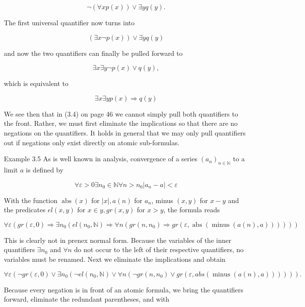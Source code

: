 \documentclass[10pt]{article}
\begin{document}
$$
\neg(\forall x p(x)) \vee \exists y q(y) .
$$

The first universal quantifier now turns into

$$
(\exists x \neg p(x)) \vee \exists y q(y)
$$

and now the two quantifiers can finally be pulled forward to

$$
\exists x \exists y \neg p(x) \vee q(y),
$$

which is equivalent to

$$
\exists x \exists y p(x) \Rightarrow q(y)
$$

We see then that in (3.4) on page 46 we cannot simply pull both quantifiers to the front. Rather, we must first eliminate the implications so that there are no negations on the quantifiers. It holds in general that we may only pull quantifiers out if negations only exist directly on atomic sub-formulas.

Example 3.5 As is well known in analysis, convergence of a series $\left(a_{n}\right)_{n \in \mathbb{N}}$ to a limit $a$ is defined by

$$
\forall \varepsilon>0 \exists n_{0} \in \mathbb{N} \forall n>n_{0}\left|a_{n}-a\right|<\varepsilon
$$

With the function $\operatorname{abs}(x)$ for $|x|, a(n)$ for $a_{n}$, minus $(x, y)$ for $x-y$ and the predicates $e l(x, y)$ for $x \in y, g r(x, y)$ for $x>y$, the formula reads


\begin{equation*}
\forall \varepsilon\left(g r(\varepsilon, 0) \Rightarrow \exists n_{0}\left(e l\left(n_{0}, \mathbb{N}\right) \Rightarrow \forall n\left(g r\left(n, n_{0}\right) \Rightarrow g r(\varepsilon, \operatorname{abs}(\operatorname{minus}(a(n), a)))\right)\right)\right) \tag{3.5}
\end{equation*}


This is clearly not in prenex normal form. Because the variables of the inner quantifiers $\exists n_{0}$ and $\forall n$ do not occur to the left of their respective quantifiers, no variables must be renamed. Next we eliminate the implications and obtain

$$
\forall \varepsilon\left(\neg g r(\varepsilon, 0) \vee \exists n_{0}\left(\neg e l\left(n_{0}, \mathbb{N}\right) \vee \forall n\left(\neg g r\left(n, n_{0}\right) \vee g r(\varepsilon, a b s(\operatorname{minus}(a(n), a)))\right)\right)\right) .
$$

Because every negation is in front of an atomic formula, we bring the quantifiers forward, eliminate the redundant parentheses, and with
\end{document}
